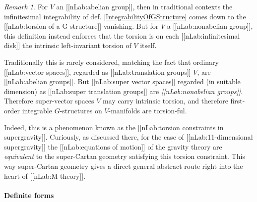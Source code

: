 \documentclass[12pt,titlepage]{article}
\theoremstyle{plain}
\theoremstyle{definition}
\theoremstyle{remark}
\newtheorem{remark}{Remark}
\begin{document}
\begin{remark}
\label{TorsionConstraints}\hypertarget{TorsionConstraints}{}
For $V$ an [[nLab:abelian group]], then in traditional contexts the infinitesimal integrability of def. \ref{IntegrabilityOfGStructure} comes down to the [[nLab:torsion of a G-structure]] vanishing. But for $V$ a [[nLab:nonabelian group]], this definition instead enforces that the torsion is on each [[nLab:infinitesimal disk]] the intrinsic left-invariant torsion of $V$ itself.

Traditionally this is rarely considered, matching the fact that ordinary [[nLab:vector spaces]], regarded as [[nLab:translation groups]] $V$, are [[nLab:abelian groups]]. But [[nLab:super vector spaces]] regarded (in suitable dimension) as [[nLab:super translation groups]] are \emph{[[nLab:nonabelian groups]]}. Therefore super-vector spaces $V$ may carry intrinsic torsion, and therefore first-order integrable $G$-structures on $V$-manifolds are torsion-ful.

Indeed, this is a phenomenon known as the [[nLab:torsion constraints in supergravity]]. Curiously, as discussed there, for the case of [[nLab:11-dimensional supergravity]] the [[nLab:equations of motion]] of the gravity theory are \emph{equivalent} to the super-Cartan geometry satisfying this torsion constraint. This way super-Cartan geometry gives a direct general abstract route right into the heart of [[nLab:M-theory]].

\end{remark}
\hypertarget{definite_forms}{}\paragraph*{{Definite forms}}\label{definite_forms}
\end{document}
